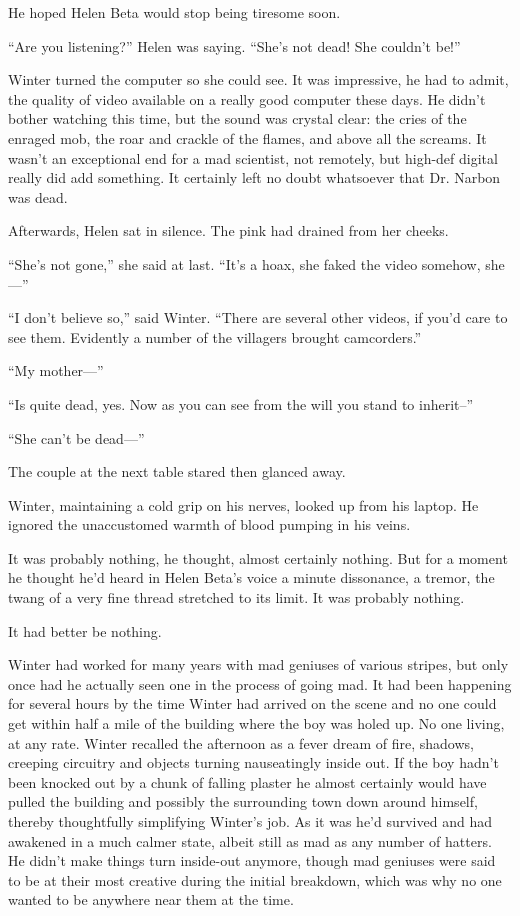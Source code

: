 \documentclass[ebook,10pt]{memoir}
\begin{document}
He hoped Helen Beta would stop being tiresome soon.

``Are you listening?'' Helen was saying. ``She's not dead! She
couldn't be!''

Winter turned the computer so she could see. It was impressive, he had
to admit, the quality of video available on a really good computer
these days. He didn't bother watching this time, but the sound was
crystal clear: the cries of the enraged mob, the roar and crackle of
the flames, and above all the screams. It wasn't an exceptional end
for a mad scientist, not remotely, but high-def digital really did add
something. It certainly left no doubt whatsoever that Dr. Narbon was
dead.

Afterwards, Helen sat in silence. The pink had drained from her
cheeks.

``She's not gone,'' she said at last. ``It's a hoax, she faked the
video somehow, she---''

``I don't believe so,'' said Winter. ``There are several other videos,
if you'd care to see them. Evidently a number of the villagers brought
camcorders.''

``My mother---''

``Is quite dead, yes. Now as you can see from the will you stand to
inherit–''

``She can't be dead---''

The couple at the next table stared then glanced away.

Winter, maintaining a cold grip on his nerves, looked up from his
laptop. He ignored the unaccustomed warmth of blood pumping in his
veins.

It was probably nothing, he thought, almost certainly nothing. But for
a moment he thought he'd heard in Helen Beta's voice a minute
dissonance, a tremor, the twang of a very fine thread stretched to its
limit. It was probably nothing.

It had better be nothing.

Winter had worked for many years with mad geniuses of various stripes,
but only once had he actually seen one in the process of going mad. It
had been happening for several hours by the time Winter had arrived on
the scene and no one could get within half a mile of the building
where the boy was holed up. No one living, at any rate. Winter
recalled the afternoon as a fever dream of fire, shadows, creeping
circuitry and objects turning nauseatingly inside out. If the boy
hadn't been knocked out by a chunk of falling plaster he almost
certainly would have pulled the building and possibly the surrounding
town down around himself, thereby thoughtfully simplifying Winter's
job. As it was he'd survived and had awakened in a much calmer state,
albeit still as mad as any number of hatters. He didn't make things
turn inside-out anymore, though mad geniuses were said to be at their
most creative during the initial breakdown, which was why no one
wanted to be anywhere near them at the time.
\end{document}
